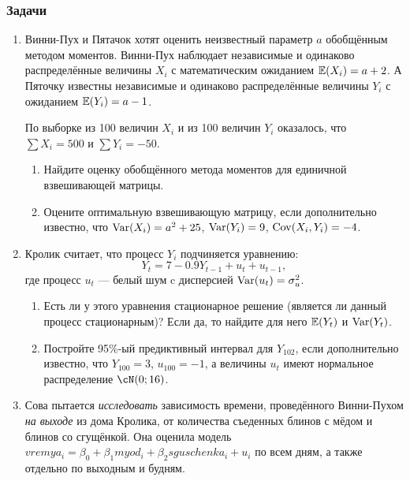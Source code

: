 \documentclass[12pt, a4paper]{article}
\begin{document}




\subsubsection{Задачи}


\begin{enumerate}
\item Винни-Пух и Пятачок хотят оценить неизвестный параметр $a$ обобщённым методом моментов.
Винни-Пух наблюдает независимые и одинаково распределённые величины $X_i$
с математическим ожиданием $\mathbb{E}(X_i)=a+2$. А Пяточку известны независимые и
одинаково распределённые величины $Y_i$ с ожиданием $\mathbb{E}(Y_i)=a-1$.

По выборке из 100 величин $X_i$ и из 100 величин $Y_i$ оказалось,
что $\sum X_i = 500$ и $\sum Y_i = -50$.

\begin{enumerate}
\item Найдите оценку обобщённого метода моментов для единичной взвешивающей матрицы.
\item Оцените оптимальную взвешивающую матрицу, если дополнительно известно,
что $\operatorname{Var}(X_i)=a^2 + 25$, $\operatorname{Var}(Y_i)=9$, $\operatorname{Cov}(X_i, Y_i)=-4$.
\end{enumerate}

\item Кролик считает, что процесс $Y_i$ подчиняется уравнению:
\[
Y_t = 7 - 0.9 Y_{t-1} + u_t + u_{t-1},
\]
где процесс $u_t$ — белый шум c дисперсией $\operatorname{Var}(u_t)=\sigma^2_u$.

\begin{enumerate}
\item Есть ли у этого уравнения стационарное решение (является ли данный процесс стационарным)?
Если да, то найдите для него $\mathbb{E}(Y_t)$ и $\operatorname{Var}(Y_t)$.
\item Постройте 95\%-ый предиктивный интервал для $Y_{102}$, если дополнительно известно,
что $Y_{100}=3$, $u_{100}=-1$, а величины $u_t$ имеют нормальное распределение $\cN(0;16)$.
\end{enumerate}

\item Сова пытается \textit{исследовать} зависимость времени,
проведённого Винни-Пухом \textit{на выходе} из дома Кролика,
от количества съеденных блинов с мёдом и блинов со сгущёнкой.
Она оценила модель $vremya_i = \beta_0 + \beta_1 myod_i + \beta_2 sguschenka_i + u_i$
по всем дням, а также отдельно по выходным и будням.


\end{enumerate}
\end{document}
